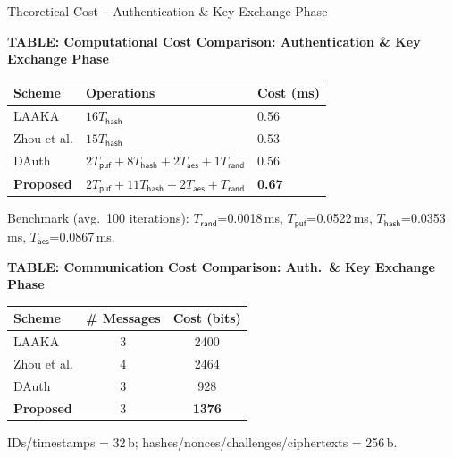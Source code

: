 \begin{frame}{Theoretical Cost -- Authentication \& Key Exchange Phase}
    \scriptsize
    \begin{center}
        \textbf{TABLE: Computational Cost Comparison: Authentication \& Key Exchange Phase}
    \end{center}
    \vspace{-0.15cm}
    \begin{center}
        \renewcommand{\arraystretch}{1.15}
        \setlength{\tabcolsep}{4pt}
        \begin{tabular}{lll}
            \toprule
            Scheme & Operations & Cost (ms) \\
            \midrule
            LAAKA      & $16T_\mathsf{hash}$ & 0.56 \\
            Zhou et al. & $15T_\mathsf{hash}$ & 0.53 \\
            DAuth    & $2T_\mathsf{puf}+8T_\mathsf{hash}+2T_\mathsf{aes}+1T_\mathsf{rand}$ & 0.56 \\
            \textbf{Proposed} & $2T_\mathsf{puf}+11T_\mathsf{hash}+2T_\mathsf{aes}+T_\mathsf{rand}$ & \textbf{0.67} \\
            \bottomrule
        \end{tabular}
    \end{center}
    \vspace{-0.05cm}
    \begin{center}
        {\tiny Benchmark (avg.\ 100 iterations): $T_\mathsf{rand}$=0.0018\,ms, $T_\mathsf{puf}$=0.0522\,ms,
        $T_\mathsf{hash}$=0.0353\,ms, $T_\mathsf{aes}$=0.0867\,ms.}
    \end{center}

    \vspace{0.15cm}
    \begin{center}
        \textbf{TABLE: Communication Cost Comparison: Auth.\ \& Key Exchange Phase}
    \end{center}
    \vspace{-0.15cm}
    \begin{center}
        \renewcommand{\arraystretch}{1.15}
        \setlength{\tabcolsep}{6pt}
        \begin{tabular}{lcc}
            \toprule
            Scheme & \# Messages & Cost (bits) \\
            \midrule
            LAAKA      & 3 & 2400 \\
            Zhou et al. & 4 & 2464 \\
            DAuth    & 3 & 928 \\
            \textbf{Proposed} & 3 & \textbf{1376} \\
            \bottomrule
        \end{tabular}
    \end{center}
    \vspace{-0.05cm}
    \begin{center}
        {\tiny IDs/timestamps = 32\,b; hashes/nonces/challenges/ciphertexts = 256\,b.}
    \end{center}
\end{frame}

